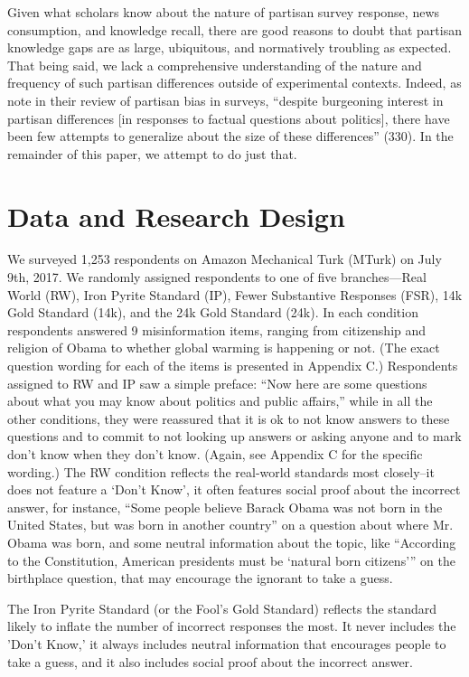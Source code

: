 \documentclass[12pt, letterpaper]{article}
\begin{document}
Given what scholars know about the nature of partisan survey response, news consumption, and knowledge recall, there are good reasons to doubt that partisan knowledge gaps are as large, ubiquitous, and normatively troubling as expected. That being said, we lack a comprehensive understanding of the nature and frequency of such partisan differences outside of experimental contexts. Indeed, as \citet{bullocklenz_2019} note in their review of partisan bias in surveys, ``despite burgeoning interest in partisan differences [in responses to factual questions about politics], there have been few attempts to generalize about the size of these differences'' (330).  In the remainder of this paper, we attempt to do just that.

\section*{Data and Research Design}

We surveyed 1,253 respondents on Amazon Mechanical Turk (MTurk) on July 9th, 2017. We randomly assigned respondents to one of five branches—Real World (RW),
Iron Pyrite Standard (IP), Fewer Substantive Responses (FSR), 14k Gold Standard (14k), and the 24k Gold Standard (24k). In each condition respondents answered 9 misinformation items, ranging from citizenship and religion of Obama to whether global warming is happening or not. (The exact question
wording for each of the items is presented in Appendix C.) Respondents assigned to RW and IP saw a simple preface: ``Now here are some questions about what you may know about politics and public affairs,'' while in all the other conditions, they were reassured that it is ok to not know answers to these questions and to commit to not looking up answers or asking anyone and to mark don't know when they don’t know. (Again, see Appendix C for the specific wording.)
The RW condition reflects the real-world standards most closely--it does not feature a `Don't Know', it often features social proof about the incorrect answer, for instance, ``Some people believe Barack Obama was not born in the United States, but was born in another country'' on a question about where Mr. Obama was born, and some neutral information about the topic, like ``According to the Constitution, American presidents must be `natural born citizens''' on the birthplace question, that may encourage the ignorant to take a guess.

The Iron Pyrite Standard (or the Fool's Gold Standard) reflects the standard likely to inflate the number of incorrect responses the most. It never includes the 'Don't Know,' it always includes neutral information that encourages people to take a guess, and it also includes social proof about the incorrect answer.
\end{document}
